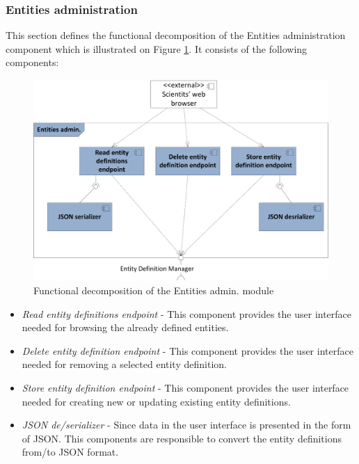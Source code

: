 \subsubsection{Entities administration}
This section defines the functional decomposition of the Entities administration component which is illustrated on Figure \ref{fig:storageFuncAdmin}. It consists of the following components:

\begin{figure}[h!]
  \centering
  	\includegraphics[scale=0.75]{storage/functional/func_admin.png}
  \caption{Functional decomposition of the Entities admin. module}
  \label{fig:storageFuncAdmin}
\end{figure}

\begin{itemize}
	\item \textit{Read entity definitions endpoint} - This component provides the user interface needed for browsing the already defined entities.
	
	\item \textit{Delete entity definition endpoint} - This component provides the user interface needed for removing a selected entity definition.
	 
	\item \textit{Store entity definition endpoint} - This component provides the user interface needed for creating new or updating existing entity definitions.
	
	\item \textit{JSON de/serializer} - Since data in the user interface is presented in the form of JSON. This components are responsible to convert the entity definitions from/to JSON format.
	
\end{itemize}

